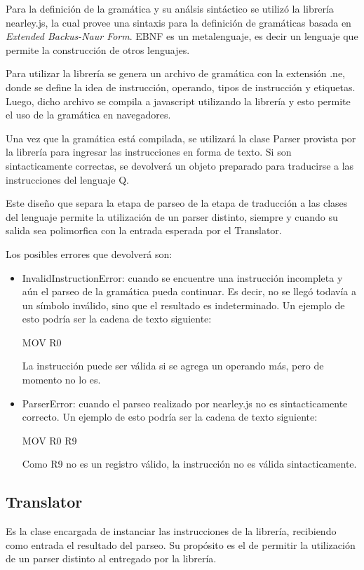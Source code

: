 Para la definición de la gramática y su análsis sintáctico se utilizó la librería nearley.js, la cual provee una sintaxis para la definición de 
gramáticas basada en \textit{Extended Backus-Naur Form}. EBNF es un metalenguaje, es decir un lenguaje que permite la construcción de otros 
lenguajes. 

Para utilizar la librería se genera un archivo de gramática con la extensión .ne, donde se define la idea de instrucción, operando, tipos de 
instrucción y etiquetas. Luego, dicho archivo se compila a javascript utilizando la librería y esto permite el uso de la gramática en navegadores.

Una vez que la gramática está compilada, se utilizará la clase Parser provista por la librería para ingresar las instrucciones en forma de texto. 
Si son sintacticamente correctas, se devolverá un objeto preparado para traducirse a las instrucciones del lenguaje Q.

Este diseño que separa la etapa de parseo de la etapa de traducción a las clases del lenguaje permite la utilización de un parser distinto, siempre y cuando
su salida sea polimorfica con la entrada esperada por el Translator.

Los posibles errores que devolverá son:
\begin{itemize}
  \item InvalidInstructionError: cuando se encuentre una instrucción incompleta y aún el parseo de la gramática pueda continuar. 
  Es decir, no se llegó todavía a un símbolo inválido, sino que el resultado es indeterminado. 
  Un ejemplo de esto podría ser la cadena de texto siguiente:
  \begin{center}
    MOV R0
  \end{center}
  La instrucción puede ser válida si se agrega un operando más, pero de momento no lo es.
  \item ParserError: cuando el parseo realizado por nearley.js no es sintacticamente correcto. Un ejemplo de esto podría ser la cadena de texto siguiente:
  \begin{center}
    MOV R0 R9
  \end{center}

  Como R9 no es un registro válido, la instrucción no es válida sintacticamente.
\end{itemize}

\subsection{Translator}
Es la clase encargada de instanciar las instrucciones de la librería, recibiendo como entrada el resultado del parseo. Su propósito es el de permitir
la utilización de un parser distinto al entregado por la librería.

